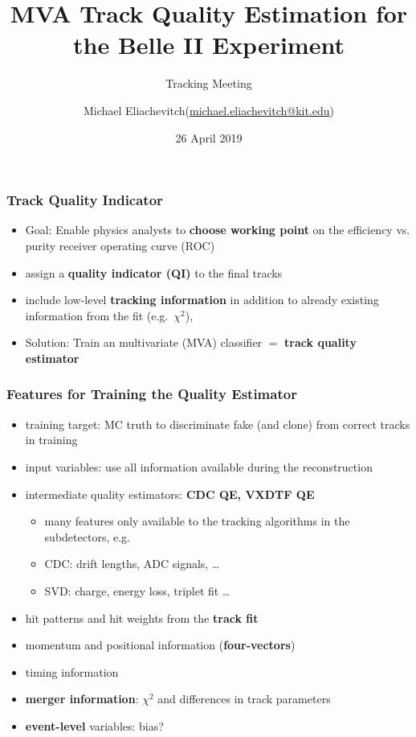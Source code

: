 \documentclass[18pt, aspectratio=169]{beamer}
\title{MVA Track Quality Estimation for the Belle II Experiment}
\subtitle{Tracking Meeting}
\author[Michael Eliachevitch
(\href{mailto:michael.eliachevitch@kit.edu}{michael.eliachevitch@kit.edu})]{Michael Eliachevitch(\href{mailto:michael.eliachevitch@kit.edu}{michael.eliachevitch@kit.edu})}
\institute[ETP -- KIT]{Institut für Experimentelle Teilchenphysik (ETP) -- KIT}
\date{26 April 2019}
\newcommand{\kitemph}[1]{\textcolor{kit-green100}{\bf{#1}}}
\begin{document}
\maketitle
\begin{frame}
  \frametitle{Track Quality Indicator}
  \begin{itemize}
  \item Goal: Enable physics analysts to \kitemph{choose working point} on the efficiency vs.
    purity receiver operating curve (ROC)
  \item assign a \kitemph{quality indicator (QI)} to the final tracks
  \item include low-level \kitemph{tracking information} in addition to already existing information
    from the fit (e.g.\ $\chi^2$),
  \item Solution: Train an multivariate (MVA) classifier $=$ \kitemph{track quality estimator}
  \end{itemize}
\end{frame}
\begin{frame}
  \frametitle{Features for Training the Quality Estimator}
    \begin{itemize}
    \item training target: MC truth to discriminate fake (and clone) from correct tracks in training
    \item input variables: use all information available during the reconstruction
    \item intermediate quality estimators: \kitemph{CDC QE, VXDTF QE}
      \begin{itemize}
      \item many features only available to the tracking algorithms in the subdetectors, e.g.
      \item CDC: drift lengths, ADC signals, \ldots
      \item SVD: charge, energy loss, triplet fit \ldots
      \end{itemize}
    \item hit patterns and hit weights from the \kitemph{track fit}
    \item momentum and positional information (\kitemph{four-vectors})
    \item timing information
    \item \kitemph{merger information}: $\chi^2$ and differences in track parameters
    \item \kitemph{event-level} variables: bias?
    \end{itemize}
\end{frame}
\end{document}
